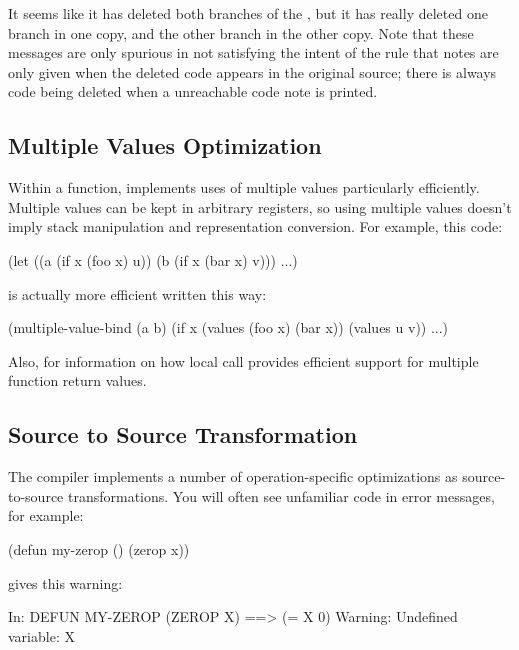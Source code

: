 It seems like it has deleted both branches of the , but it has really
deleted one branch in one copy, and the other branch in the other copy.  Note
that these messages are only spurious in not satisfying the intent of the rule
that notes are only given when the deleted code appears in the original source;
there is always  code being deleted when a unreachable code note is
printed.


\subsection{Multiple Values Optimization}

Within a function, \python{} implements uses of multiple values
particularly efficiently.  Multiple values can be kept in arbitrary
registers, so using multiple values doesn't imply stack manipulation
and representation conversion.  For example, this code:
\begin{example}
(let ((a (if x (foo x) u))
      (b (if x (bar x) v)))
  ...)
\end{example}
is actually more efficient written this way:
\begin{example}
(multiple-value-bind
    (a b)
    (if x
        (values (foo x) (bar x))
        (values u v))
  ...)
\end{example}

Also,  for information on how local call
provides efficient support for multiple function return values.


\subsection{Source to Source Transformation}

The compiler implements a number of operation-specific optimizations as
source-to-source transformations.  You will often see unfamiliar code in error
messages, for example:

\begin{lisp}
(defun my-zerop () (zerop x))
\end{lisp}

gives this warning:

\begin{example}
In: DEFUN MY-ZEROP
  (ZEROP X)
==>
  (= X 0)
Warning: Undefined variable: X
\end{example}


